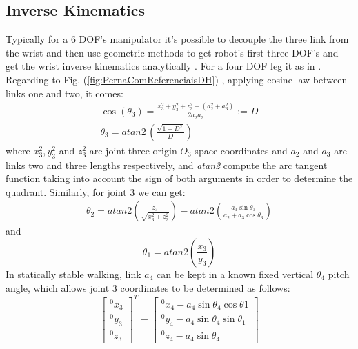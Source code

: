 \subsection{Inverse Kinematics}
Typically for a 6 DOF's manipulator it's possible to decouple the three link from the wrist and then use geometric methods to get robot's first three DOF's and get the wrist inverse kinematics analytically \cite{spong_robot_2006}. For a four DOF leg it as in \cite{bonitz_mars_1997}. Regarding to Fig. (\ref{fig:PernaComReferenciaisDH}) , applying cosine law between links one and two, it comes:
\begin{eqnarray}
	\cos(\theta_3)=\frac{x_3^2+y_3^2+z_3^2-(a_2^2+a_3^2)}{2a_2a_3}:=D\nonumber \\
	\theta_3= atan2\,\left(\frac{\sqrt{1-D^2}}{D}\right) \label{eq:theta3}	
\end{eqnarray}
where $x_3^2, y_3^2$ and $z_3^2$ are joint three origin $O_3$ space coordinates and $a_2$ and $a_3$ are links two and three lengths respectively, and \textit{atan2} compute the arc tangent function taking into account the sign of both arguments in order to determine the quadrant. Similarly, for joint 3 we can get:
\begin{eqnarray}
\theta_2=atan2\left(\frac{z_3}{\sqrt{x_3^2+z_3^2}}\right)-atan2\left(\frac{a_3\sin 		\theta_3}{a_2+a_3 \cos \theta_3}\right)	 \label{eq:theta2}
\end{eqnarray}
and
\begin{equation}
	\theta_1=atan2 \left(\frac{x_3}{y_3}\right)  \label{eq:theta1}
\end{equation}
In statically stable walking, link $a_4$ can be kept in a known fixed vertical $\theta_4$ pitch angle, which allows joint 3 coordinates to be determined as follows:
\begin{equation}
\begin{bmatrix}
^0x_3\\^0y_3\\^0z_3
\end{bmatrix}^T=
\begin{bmatrix}
^0x_4-a_4\sin\theta_4\cos\theta1\\ ^0y_4-a_4 \sin \theta_4 \sin \theta_1\\^0z_4-a_4\sin \theta_4
\end{bmatrix} \label{eq:join3Coordinates}
\end{equation}
